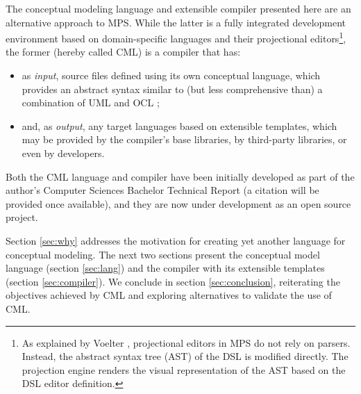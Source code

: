 The conceptual modeling language and extensible compiler presented here are an alternative approach to MPS.
While the latter is a fully integrated development environment based on domain-specific languages and their projectional editors\footnote{As explained by Voelter \cite{voelter}, projectional editors in MPS do not rely on parsers.
Instead, the abstract syntax tree (AST) of the DSL is modified directly.
The projection engine renders the visual representation of the AST based on the DSL editor definition.},
the former (hereby called CML) is a compiler that has:
\begin{itemize}
\item as \emph{input}, source files defined using its own conceptual language,
which provides an abstract syntax similar to (but less comprehensive than) a combination of UML \cite{uml} and OCL \cite{ocl}; 
\item and, as \emph{output}, any target languages based on extensible templates,
which may be provided by the compiler's base libraries, by third-party libraries, or even by developers.
\end{itemize}

Both the CML language and compiler have been initially developed as part of the author's Computer Sciences Bachelor Technical Report (a citation will be provided once available),
and they are now under development \cite{cml-repo} as an open source project.

Section \ref{sec:why} addresses the motivation for creating yet another language for conceptual modeling.
The next two sections present the conceptual model language (section \ref{sec:lang}) and the compiler with its extensible templates (section \ref{sec:compiler}).
We conclude in section \ref{sec:conclusion},
reiterating the objectives achieved by CML and exploring alternatives to validate the use of CML.
